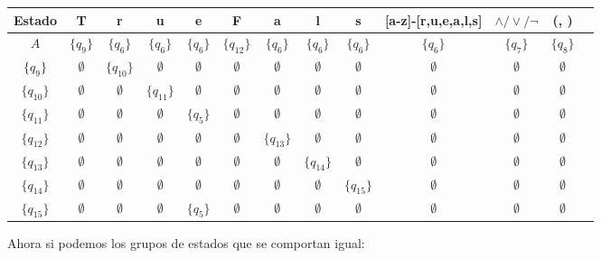 \begin{table}[h!]
\centering
\begin{tabular}{|c|c|c|c|c|c|c|c|c|c|c|c|c|}
\hline
Estado &T & r & u & e & F & a & l &s &[a-z]-[r,u,e,a,l,s] &$\land/\lor/\lnot$ & (, )\\ \hline
\hline
$A$ & $\{q_9\}$ & $\{q_6\}$ & $\{q_6\}$ & $\{q_{6}\}$ & $\{q_{12}\}$ & $\{q_6\}$ & $\{q_6\}$ & $\{q_6\}$ & $\{q_6\}$ & $\{q_7\}$& $\{q_8\}$\\ \hline
$\{q_9\}$ & $\emptyset$ & $\{q_{10}\}$ & $\emptyset$ & $\emptyset$ & $\emptyset$  & $\emptyset$ & $\emptyset$ & $\emptyset$ & $\emptyset$ & $\emptyset$ & $\emptyset$\\ \hline
$\{q_{10}\}$ & $\emptyset$ &  $\emptyset$&  $\{q_{11}\}$& $\emptyset$ & $\emptyset$  & $\emptyset$ & $\emptyset$ & $\emptyset$ & $\emptyset$ & $\emptyset$ & $\emptyset$\\ \hline
$\{q_{11}\}$ & $\emptyset$ &  $\emptyset$& $\emptyset$ &  $\{q_{5}\}$& $\emptyset$  & $\emptyset$ & $\emptyset$ & $\emptyset$ & $\emptyset$ & $\emptyset$ & $\emptyset$\\ \hline
$\{q_{12}\}$ & $\emptyset$ & $\emptyset$ & $\emptyset$ & $\emptyset$  & $\emptyset$  & $\{q_{13}\}$ & $\emptyset$ & $\emptyset$& $\emptyset$ & $\emptyset$ & $\emptyset$\\ \hline
$\{q_{13}\}$ & $\emptyset$ &  $\emptyset$& $\emptyset$ & $\emptyset$ & $\emptyset$  & $\emptyset$ & $\{q_{14}\}$ & $\emptyset$ & $\emptyset$ & $\emptyset$ & $\emptyset$\\ \hline
$\{q_{14}\}$ & $\emptyset$ &  $\emptyset$& $\emptyset$ & $\emptyset$ & $\emptyset$  & $\emptyset$ & $\emptyset$ & $\{q_{15}\}$ & $\emptyset$ & $\emptyset$ & $\emptyset$\\ \hline
$\{q_{15}\}$ & $\emptyset$ &  $\emptyset$& $\emptyset$ & $\{q_{5}\}$ & $\emptyset$  & $\emptyset$ & $\emptyset$ & $\emptyset$ & $\emptyset$ & $\emptyset$ & $\emptyset$\\ \hline
\end{tabular}
\end{table}

Ahora si podemos los grupos de estados que se comportan igual:

